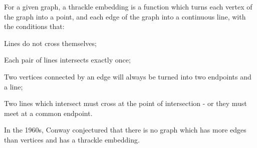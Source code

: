 For a given graph, a thrackle embedding is a function which 
turns each vertex of the graph into a point, and each edge
of the graph into a continuous line, with the conditions that:
\par
Lines do not cross themselves;
\par
Each pair of lines intersects exactly once;
\par
Two vertices connected by an edge will always be turned into
two endpoints and a line;
\par
Two lines which intersect must cross at the point of intersection -
or they must meet at a common endpoint.

\par
In the 1960s, Conway conjectured that there is no graph which has 
more edges than vertices and has a thrackle embedding.